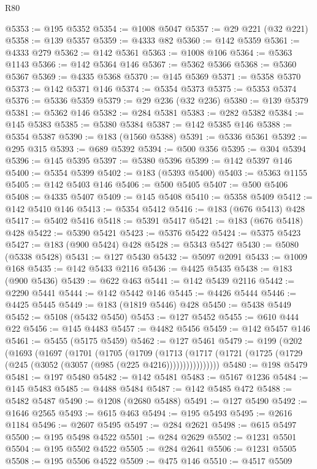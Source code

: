 \begin{lexlean}{R80}
\begin{coremodule}
@5353 := @195 @5352
@5354 := @1008 @5047
@5357 := @29 @221 (@32 @221)
@5358 := @139 @5357
@5359 := @4333 @82
@5360 := @142 @5359
@5361 := @4333 @279
@5362 := @142 @5361
@5363 := @1008 @106
@5364 := @5363 @1143
@5366 := @142 @5364 @146
@5367 := @5362 @5366
@5368 := @5360 @5367
@5369 := @4335 @5368
@5370 := @145 @5369
@5371 := @5358 @5370
@5373 := @142 @5371 @146
@5374 := @5354 @5373
@5375 := @5353 @5374
@5376 := @5336 @5359
@5379 := @29 @236 (@32 @236)
@5380 := @139 @5379
@5381 := @5362 @146
@5382 := @284 @5381
@5383 := @282 @5382
@5384 := @145 @5383
@5385 := @5380 @5384
@5387 := @142 @5385 @146
@5388 := @5354 @5387
@5390 := @183 (@1560 @5388)
@5391 := @5336 @5361
@5392 := @295 @315
@5393 := @689 @5392
@5394 := @500 @356
@5395 := @304 @5394
@5396 := @145 @5395
@5397 := @5380 @5396
@5399 := @142 @5397 @146
@5400 := @5354 @5399
@5402 := @183 (@5393 @5400)
@5403 := @5363 @1155
@5405 := @142 @5403 @146
@5406 := @500 @5405
@5407 := @500 @5406
@5408 := @4335 @5407
@5409 := @145 @5408
@5410 := @5358 @5409
@5412 := @142 @5410 @146
@5413 := @5354 @5412
@5416 := @183 (@676 @5413) @428
@5417 := @5402 @5416
@5418 := @5391 @5417
@5421 := @183 (@676 @5418) @428
@5422 := @5390 @5421
@5423 := @5376 @5422
@5424 := @5375 @5423
@5427 := @183 (@900 @5424) @428
@5428 := @5343 @5427
@5430 := @5080 (@5338 @5428)
@5431 := @127 @5430
@5432 := @5097 @2091
@5433 := @1009 @168
@5435 := @142 @5433 @2116
@5436 := @4425 @5435
@5438 := @183 (@900 @5436)
@5439 := @622 @463
@5441 := @142 @5439 @2116
@5442 := @2290 @5441
@5444 := @142 @5442 @146
@5445 := @4426 @5444
@5446 := @4425 @5445
@5449 := @183 (@1819 @5446) @428
@5450 := @5438 @5449
@5452 := @5108 (@5432 @5450)
@5453 := @127 @5452
@5455 := @610 @444 @22
@5456 := @145 @4483
@5457 := @4482 @5456
@5459 := @142 @5457 @146
@5461 := @5455 (@5175 @5459)
@5462 := @127 @5461
@5479 := @199
    (@202
      (@1693
        (@1697
          (@1701
            (@1705
              (@1709
                (@1713
                  (@1717 (@1721 (@1725 (@1729 (@245 (@3052 (@3057 (@985 (@225 @4216))))))))))))))))
@5480 := @198 @5479
@5481 := @197 @5480
@5482 := @142 @5481
@5483 := @5167 @1236
@5484 := @145 @5483
@5485 := @4488 @5484
@5487 := @142 @5485 @472
@5488 := @5482 @5487
@5490 := @1208 (@2680 @5488)
@5491 := @127 @5490
@5492 := @1646 @2565
@5493 := @615 @463
@5494 := @195 @5493
@5495 := @2616 @1184
@5496 := @2607 @5495
@5497 := @284 @2621
@5498 := @615 @5497
@5500 := @195 @5498 @4522
@5501 := @284 @2629
@5502 := @1231 @5501
@5504 := @195 @5502 @4522
@5505 := @284 @2641
@5506 := @1231 @5505
@5508 := @195 @5506 @4522
@5509 := @475 @146
@5510 := @4517 @5509

\end{coremodule}
\end{lexlean}
